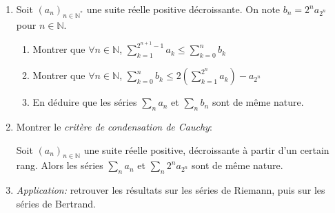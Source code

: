 \documentclass{yann}
\begin{document}
\begin{enumerate}
\item
  Soit $(a_n)_{n∈ℕ^*}$ une suite réelle positive décroissante.
  On note $b_n = 2^n a_{2^n}$ pour $n∈ℕ$.
  \begin{enumerate}
  \item
    Montrer que $∀n∈ℕ$, $∑_{k = 1}^{2^{n+1}-1} a_k≤∑_{k=0}^n b_k$
  \item
    Montrer que $∀n∈ℕ$, $∑_{k = 0}^n b_k ≤2\left( ∑_{k=1}^{2^n} a_k \right) - a_{2^n}$
  \item
    En déduire que les séries $∑_n a_n$ et $∑_n b_n$ sont de même nature.
  \end{enumerate}
\item
  Montrer le \emph{critère de condensation de Cauchy}:

  Soit $(a_n)_{n∈ℕ}$ une suite réelle positive, décroissante à partir d'un certain rang.
  Alors les séries $∑_n a_n$ et $∑_n 2^n a_{2^n}$ sont de même nature.
\item
  \emph{Application:} retrouver les résultats sur les séries de Riemann, puis sur les séries de Bertrand.
\end{enumerate}
\end{document}
